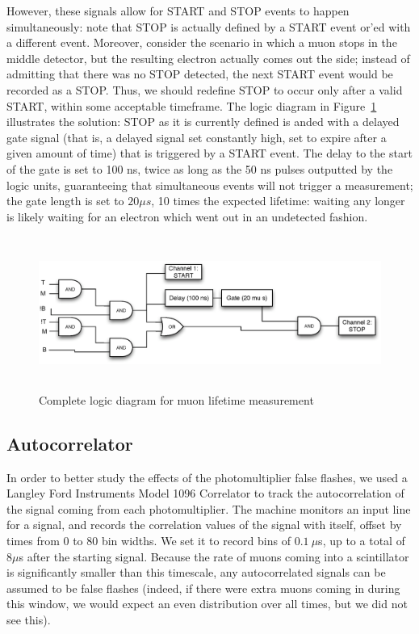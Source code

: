 However, these signals allow for START and STOP events to happen simultaneously: note that STOP is actually defined by a START event or'ed with a different event. Moreover, consider the scenario in which a muon stops in the middle detector, but the resulting electron actually comes out the side; instead of admitting that there was no STOP detected, the next START event would be recorded as a STOP. Thus, we should redefine STOP to occur only after a valid START, within some acceptable timeframe. The logic diagram in Figure~\ref{figure:logic} illustrates the solution: STOP as it is currently defined is anded with a delayed gate signal (that is, a delayed signal set constantly high, set to expire after a given amount of time) that is triggered by a START event. The delay to the start of the gate is set to 100 ns, twice as long as the 50 ns pulses outputted by the logic units, guaranteeing that simultaneous events will not trigger a measurement; the gate length is set to $20 \mu s$, 10 times the expected lifetime: waiting any longer is likely waiting for an electron which went out in an undetected fashion.

\begin{figure}[htbp]
\begin{center}
\includegraphics[height=50mm]{./figures/logicdiagram.eps}
\caption{Complete logic diagram for muon lifetime measurement}
\label{figure:logic}
\end{center}
\end{figure}

\subsection{Autocorrelator}
\label{autocorrelator}
In order to better study the effects of the photomultiplier false flashes, we used a Langley Ford Instruments Model 1096 Correlator to track the autocorrelation of the signal coming from each photomultiplier. The machine monitors an input line for a signal, and records the correlation values of the signal with itself, offset by times from $0$ to $80$ bin widths. We set it to record bins of $0.1~\mu$s, up to a total of $8 \mu$s after the starting signal. Because the rate of muons coming into a scintillator is significantly smaller than this timescale, any autocorrelated signals can be assumed to be false flashes (indeed, if there were extra muons coming in during this window, we would expect an even distribution over all times, but we did not see this).

